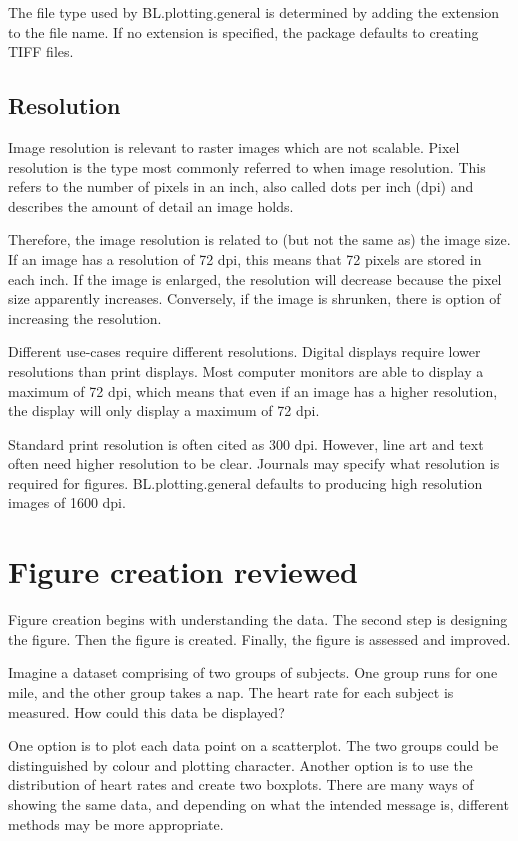 \documentclass[letterpaper]{report}\usepackage[]{graphicx}\usepackage[]{color}
\begin{document}
The file type used by BL.plotting.general is determined by adding the extension to the file name. If no extension is specified, the package defaults to creating TIFF files.

\subsection{Resolution}
Image resolution is relevant to raster images which are not scalable. Pixel resolution is the type most commonly referred to when image resolution. This refers to the number of pixels in an inch, also called dots per inch (dpi) and describes the amount of detail an image holds.

Therefore, the image resolution is related to (but not the same as) the image size. If an image has a resolution of 72 dpi, this means that 72 pixels are stored in each inch. If the image is enlarged, the resolution will decrease because the pixel size apparently increases. Conversely, if the image is shrunken, there is option of increasing the resolution.

Different use-cases require different resolutions. Digital displays require lower resolutions than print displays. Most computer monitors are able to display a maximum of 72 dpi, which means that even if an image has a higher resolution, the display will only display a maximum of 72 dpi. 

Standard print resolution is often cited as 300 dpi. However, line art and text often need higher resolution to be clear. Journals may specify what resolution is required for figures. BL.plotting.general defaults to producing high resolution images of 1600 dpi.

\section{Figure creation reviewed}
Figure creation begins with understanding the data. The second step is designing the figure. Then the figure is created. Finally, the figure is assessed and improved.

Imagine a dataset comprising of two groups of subjects. One group runs for one mile, and the other group takes a nap. The heart rate for each subject is measured. How could this data be displayed? 

One option is to plot each data point on a scatterplot. The two groups could be distinguished by colour and plotting character. Another option is to use the distribution of heart rates and create two boxplots. There are many ways of showing the same data, and depending on what the intended message is, different methods may be more appropriate.
\end{document}
